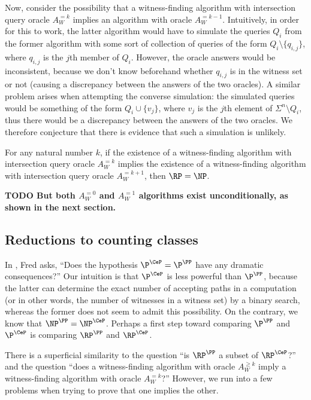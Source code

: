 \documentclass{article}
\newcommand{\todo}[1]{\textbf{TODO #1}}
\begin{document}
Now, consider the possibility that a witness-finding algorithm with intersection query oracle $A^{= k}_W$ implies an algorithm with oracle $A^{= k - 1}_W$.
Intuitively, in order for this to work, the latter algorithm would have to simulate the queries $Q_i$ from the former algorithm with some sort of collection of queries of the form $Q_i \setminus \{q_{i, j}\}$, where $q_{i, j}$ is the $j$th member of $Q_i$.
However, the oracle answers would be inconsistent, because we don't know beforehand whether $q_{i, j}$ is in the witness set or not (causing a discrepancy between the answers of the two oracles).
A similar problem arises when attempting the converse simulation: the simulated queries would be something of the form $Q_i \cup \{v_j\}$, where $v_j$ is the $j$th element of $\Sigma^n \setminus Q_i$, thus there would be a discrepancy between the answers of the two oracles.
We therefore conjecture that there is evidence that such a simulation is unlikely.

\begin{conjecture}
  For any natural number $k$, if the existence of a witness-finding algorithm with intersection query oracle $A^{= k}_W$ implies the existence of a witness-finding algorithm with intersection query oracle $A^{= k + 1}_W$, then $\RP = \NP$.

  \todo{But both $A^{= 0}_W$ and $A^{= 1}_W$ algorithms exist unconditionally, as shown in the next section.}
\end{conjecture}

\subsection{Reductions to counting classes}

In \autocite[Section~7]{green93}, Fred asks, ``Does the hypothesis $\P^{\CeP} = \P^\PP$ have any dramatic consequences?''
Our intuition is that $\P^{\CeP}$ is less powerful than $\P^\PP$, because the latter can determine the exact number of accepting paths in a computation (or in other words, the number of witnesses in a witness set) by a binary search, whereas the former does not seem to admit this possibility.
On the contrary, we know that $\NP^\PP = \NP^{\CeP}$.
Perhaps a first step toward comparing $\P^\PP$ and $\P^{\CeP}$ is comparing $\RP^\PP$ and $\RP^{\CeP}$.

There is a superficial similarity to the question ``is $\RP^\PP$ a subset of $\RP^{\CeP}$?'' and the question ``does a witness-finding algorithm with oracle $A^{\geq k}_W$ imply a witness-finding algorithm with oracle $A^{= k}_W$?''
However, we run into a few problems when trying to prove that one implies the other.
\end{document}
